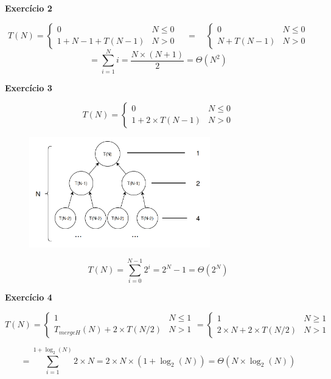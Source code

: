 \documentclass[a4paper,11pt]{article}
\begin{document}
	\noindent \textbf{Exercício 2}
	
	\[
		T(N) =
		\begin{cases}
			0 & N \leq 0 \\
			1 + N - 1 + T(N - 1) & N > 0
		\end{cases}
		\quad = \quad
		\begin{cases}
			0 & N \leq 0 \\
			N + T(N - 1) & N > 0
		\end{cases}
	\]
	\[
		= \sum_{i=1}^{N} i = \frac{N \times (N + 1)}{2} = \Theta(N^2)
	\]
	
	
	\noindent \textbf{Exercício 3}
	
	\[
		T(N) = 
		\begin{cases}
			0 & N \leq 0 \\
			1 + 2 \times T(N - 1) & N > 0
		\end{cases}
	\]
	
	\begin{figure}[h]
		\centering
		\includegraphics[width=0.7\textwidth]{imgs/2_3.png}
	\end{figure}
	
	\[
		T(N) = \sum_{i=0}^{N-1} 2^i = 2^N - 1 = \Theta(2^N)
	\]
	
	\newpage
	
	\noindent \textbf{Exercício 4}
	
	\[
		T(N) = 
		\begin{cases}
			1 & N \leq 1 \\
			T_{mergeH}(N) + 2 \times T(N / 2) & N > 1
		\end{cases}
		=
		\begin{cases}
			1 & N \geq 1 \\
			2 \times N + 2 \times T(N/2) & N > 1
		\end{cases}
	\]
	
	\[
		= \sum_{i=1}^{1 + \log_2(N)} 2 \times N = 2 \times N \times (1 + \log_2(N)) = \Theta(N \times \log_2(N))
	\]
	
\end{document}
